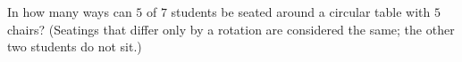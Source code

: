 In how many ways can $5$ of $7$ students be seated around a circular table with $5$ chairs? (Seatings that differ only by a rotation are considered the same; the other two students do not sit.)
